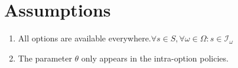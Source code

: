 \section{Assumptions}

\begin{enumerate}[label=\textbf{A\arabic*}., leftmargin=*, ref={A\arabic*}]
    \item\label{asum:opt-all} All options are available everywhere.\@ \( \forall s \in S, \forall \omega \in \Omega: s \in \mathcal{I}_\omega \)
    \item\label{asum:theta-param} The parameter \( \theta \) only appears in the intra-option policies.
\end{enumerate}
